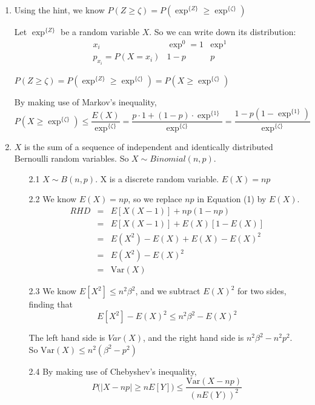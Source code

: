 \documentclass[12pt,thmsa]{article}\usepackage[]{graphicx}\usepackage[]{color}
\begin{document}
\begin{enumerate}
\item Using the hint, we know $P(Z \geq  \zeta) = P (\exp^{\{Z\}}\geq \exp^{\{\zeta\}})$

Let $\exp^{\{Z\}}$ be a random variable $X$. So we can write down its distribution:
$$
\begin{array}{c|cc}
x_i & \exp^{0}=1 & \exp^{1}\\
\hline
p_{x_i}  = P(X=x_i) & 1-p & p
\end{array}
$$

$P(Z \geq  \zeta) = P (\exp^{\{Z\}}\geq \exp^{\{\zeta\}})= P(X \geq \exp^{\{\zeta\}})$

By making use of Markov's inequality,
 \begin{equation*}
P(X \geq \exp^{\{\zeta\}}) \leq \frac{E(X)}{\exp^{\{\zeta\}}} = \frac{p\cdot1+(1-p)\cdot \exp^{\{1\}}}{\exp^{\{\zeta\}}}=\frac{1-p(1-\exp^{\{1\}})}{\exp^{\{\zeta\}}}
\end{equation*}

\item $X$ is the sum of a sequence of independent and identically distributed Bernoulli random variables. So $X \sim Binomial(n,p)$.

\begin{itemize}
 \item[2.1] $X \sim B(n,p)$. X is a discrete random variable. $E(X)=np$
\item[2.2] We know $E(X)=np$, so we replace $np$ in Equation (1) by $E(X)$.
  \begin{eqnarray*}
RHD &=& E[X(X-1)]+np(1-np)\\
&=& E[X(X-1)]+E(X)[1-E(X)] \\
&=& E(X^2)-E(X)+E(X)-E(X)^2\\
&=& E(X^2)-E(X)^2 \\
&=& \text{Var}(X)
\end{eqnarray*}

\item[2.3] We know $E[X^2]\leq n^2\beta^2$, and we subtract $E(X)^2$ for two sides, finding that
$$E[X^2]-E(X)^2\leq n^2\beta^2-E(X)^2$$

The left hand side is $Var(X)$, and the right hand side is $n^2\beta^2-n^2p^2$. \\
So $\text{Var}(X) \leq n^2(\beta^2 -p^2)$

\item[2.4] By making use of Chebyshev's inequality,
$$  P\Big( \vert X-np \vert \geq nE[Y] \Big)  \leq  \frac{\text{Var}(X-np)}{(nE(Y))^2}$$


\end{itemize}
\end{enumerate}
\end{document}

